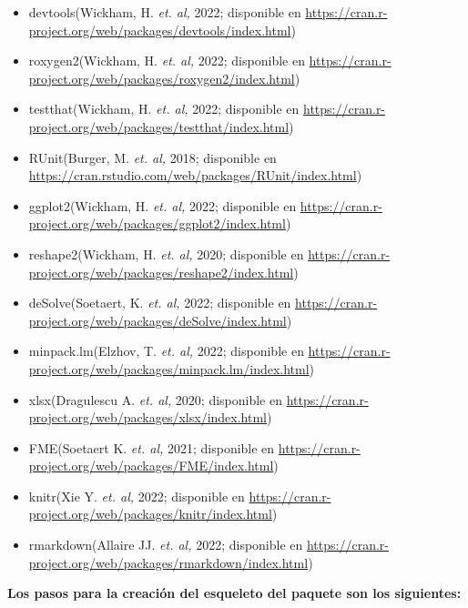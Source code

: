 \begin{itemize}
    \item devtools(Wickham, H. \textit{et. al,} 2022; disponible en \url{https://cran.r-project.org/web/packages/devtools/index.html})
    \item roxygen2(Wickham, H. \textit{et. al,} 2022; disponible en \url{https://cran.r-project.org/web/packages/roxygen2/index.html})
    \item testthat(Wickham, H. \textit{et. al,} 2022; disponible en \url{https://cran.r-project.org/web/packages/testthat/index.html})
    \item RUnit(Burger, M. \textit{et. al,} 2018; disponible en \url{https://cran.rstudio.com/web/packages/RUnit/index.html})
    \item ggplot2(Wickham, H. \textit{et. al,} 2022; disponible en \url{https://cran.r-project.org/web/packages/ggplot2/index.html})
    \item reshape2(Wickham, H. \textit{et. al,} 2020; disponible en \url{https://cran.r-project.org/web/packages/reshape2/index.html})
    \item deSolve(Soetaert, K. \textit{et. al,} 2022; disponible en \url{https://cran.r-project.org/web/packages/deSolve/index.html})
    \item minpack.lm(Elzhov, T. \textit{et. al,} 2022; disponible en \url{https://cran.r-project.org/web/packages/minpack.lm/index.html})
    \item xlsx(Dragulescu A. \textit{et. al,} 2020; disponible en \url{https://cran.r-project.org/web/packages/xlsx/index.html})
    \item FME(Soetaert K. \textit{et. al,} 2021; disponible en \url{https://cran.r-project.org/web/packages/FME/index.html})
    \item knitr(Xie Y. \textit{et. al,} 2022; disponible en \url{https://cran.r-project.org/web/packages/knitr/index.html})
    \item rmarkdown(Allaire JJ. \textit{et. al,} 2022; disponible en \url{https://cran.r-project.org/web/packages/rmarkdown/index.html})
\end{itemize}

\noindent
\textbf{Los pasos para la creaci\'on del esqueleto del paquete son los siguientes:\\}

